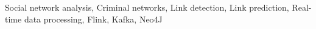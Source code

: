 \begin{keywords}
Social network analysis, Criminal networks, Link detection, Link prediction, Real-time data processing, Flink, Kafka, Neo4J    
\end{keywords}



